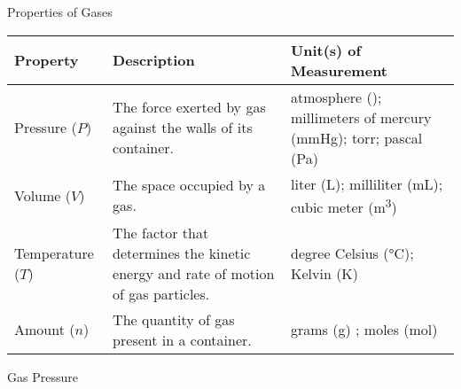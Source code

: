 \documentclass[notes=hide]{beamer}
\begin{document}
\begin{frame}{Properties of Gases}
	\begin{center}
	\begin{tabularx}{\linewidth} {l *{2}{>{\raggedright\arraybackslash}X}}
		\toprule
		\bfseries Property & \bfseries Description & \bfseries Unit(s)
		of Measurement \\ \midrule
		Pressure ($P$) & The force exerted by gas against the walls of
		its container. & atmosphere (\si{\atm}); millimeters of mercury
		(\si{\mmHg}); torr; pascal (\si{\pascal}) \\
		Volume ($V$) & The space occupied by a gas. & liter
		(\si{\liter}); milliliter (\si{\milli\liter}); cubic meter
		(\si{\meter\cubed}) \\
		Temperature ($T$) & The factor that determines the kinetic
		energy and rate of motion of gas particles. & degree Celsius
		(\si{\celsius}); Kelvin (\si{\kelvin}) \\
		Amount ($n$) & The quantity of gas present in a container. &
		grams (\si{\gram}) ; moles (\si{\mole}) \\ \bottomrule
	\end{tabularx}
	\end{center}
\end{frame}

\begin{frame}{Gas Pressure}

\end{frame}
\end{document}
